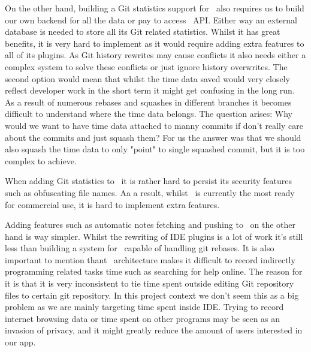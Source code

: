 On the other hand, building a Git statistics support for~ also requires us to build our own backend
for all the data or pay to access~ API.
Either way an external database is needed to store all its Git related statistics.
Whilst it has great benefits, it is very hard to implement as it would require adding extra features to all of its plugins.
As Git history rewrites may cause conflicts it also needs either a complex system to solve these conflicts or just ignore history overwrites.
The second option would mean that whilst the time data saved would very closely reflect developer work in the short term it might get
confusing in the long run.
As a result of numerous rebases and squashes in different branches it becomes difficult to understand where the time data belongs.
The question arises: Why would we want to have time data attached to manny commits if don't really care about the commits and just squash them?
For us the answer was that we should also squash the time data to only "point" to single squashed commit, but it is too complex to achieve.

When adding Git statistics to~ it is rather hard to persist its security features such as obfuscating file names.
Aa a result, whilst~ is currently the most ready for commercial use, it is hard to implement extra features.

Adding features such as automatic notes fetching and pushing to~ on the other hand is way simpler.
Whilst the rewriting of IDE plugins is a lot of work it's still less than building a system for~ capable of handling git rebases.
It is also important to mention thant~ architecture makes it difficult to record indirectly programming related tasks time
such as searching for help online.
The reason for it is that it is very inconsistent to tie time spent outside editing Git repository files to certain git repository.
In this project context we don't seem this as a big problem as we are mainly targeting time spent inside IDE.
Trying to record internet browsing data or time spent on other programs may be seen as an invasion of privacy,
and it might greatly reduce the amount of users interested in our app.
